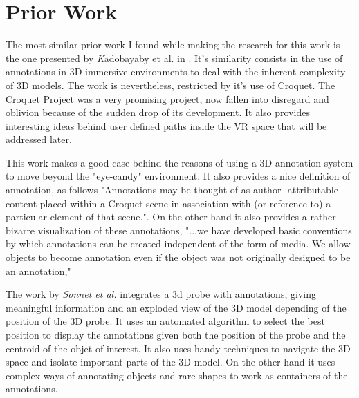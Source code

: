 \section{Prior Work}
The most similar prior work I found while making the research for this work is the one presented by {\emph Kadobayaby et al.} in \cite{Kadobayashi}. It's similarity consists in the use of annotations in 3D immersive environments to deal with the inherent complexity of 3D models. The work is nevertheless, restricted by it's use of Croquet. The Croquet Project was a very promising project, now fallen into disregard and oblivion because of the sudden drop of its development. It also provides interesting ideas behind user defined paths inside the VR space that will be addressed later.

This work makes a good case behind the reasons of using a 3D annotation system to move beyond the "eye-candy" environment. It also provides a nice definition of annotation, as follows "Annotations may be thought of as author- attributable content placed within a Croquet scene in association with (or reference to) a particular element of that scene.". On the other hand it also provides a rather bizarre visualization of these annotations, "...we have developed basic conventions by which annotations can be created independent of the form of media. We allow objects to become annotation even if the object was not originally designed to be an annotation," 

The work by {\em Sonnet et al.} \cite{Sonnet} integrates a 3d probe with annotations, giving meaningful information and an exploded view of the 3D model depending of the position of the 3D probe. It uses an automated algorithm to select the best position to display the annotations given both the position of the probe and the centroid of the objet of interest. It also uses handy techniques to navigate the 3D space and isolate important parts of the 3D model. On the other hand it uses complex ways of annotating objects and rare shapes to work as containers of the annotations.

